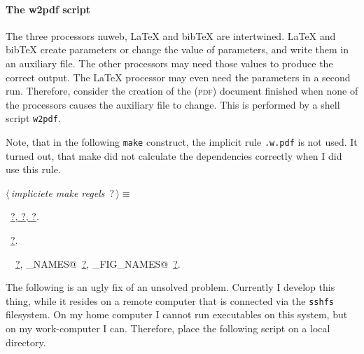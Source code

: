 \documentclass[twoside]{artikel3}
\newcommand{\pdf}{\textsc{pdf}}
\renewcommand{\NWlink}[2]{\hyperlink{#1}{#2}}
\renewcommand{\NWtarget}[2]{\hypertarget{#1}{#2}}
\renewcommand{\NWsep}{$\diamond$\rule[-1\baselineskip]{0pt}{1\baselineskip}}
\renewcommand{\NWlink}[2]{\hyperlink{#1}{#2}}
\renewcommand{\NWtarget}[2]{\hypertarget{#1}{#2}}
\begin{document}
\paragraph{The w2pdf script}
\label{sec:w2pdf}

The three processors nuweb, \LaTeX{} and bib\TeX{} are
intertwined. \LaTeX{} and bib\TeX{} create parameters or change the
value of parameters, and write them in an auxiliary file. The other
processors may need those values to produce the correct output. The
\LaTeX{} processor may even need the parameters in a second
run. Therefore, consider the creation of the (\pdf) document finished
when none of the processors causes the auxiliary file to change. This
is performed by a shell script \verb|w2pdf|.




Note, that in the following \texttt{make} construct, the implicit rule
\verb|.w.pdf| is not used. It turned out, that make did not calculate
the dependencies correctly when I did use this rule.

\begin{flushleft} \small
\begin{minipage}{\linewidth}\label{scrap18}\raggedright\small
\NWtarget{nuweb?}{} $\langle\,${\itshape impliciete make regels}\nobreak\ {\footnotesize {?}}$\,\rangle\equiv$
\vspace{-1ex}
\vspace{-1.5ex}
\footnotesize
\begin{list}{}{\setlength{\itemsep}{-\parsep}\setlength{\itemindent}{-\leftmargin}}
\item \NWtxtMacroDefBy\ \NWlink{nuweb?}{?}\NWlink{nuweb?}{, ?}\NWlink{nuweb?}{, ?}.
\item \NWtxtMacroRefIn\ \NWlink{nuweb?}{?}.
\item \NWtxtIdentsUsed\nobreak\  \verb@pdf@\nobreak\ \NWlink{nuweb?}{?}, \verb@PDFT_NAMES@\nobreak\ \NWlink{nuweb?}{?}, \verb@PDF_FIG_NAMES@\nobreak\ \NWlink{nuweb?}{?}.
\item{}
\end{list}
\end{minipage}\vspace{4ex}
\end{flushleft}
The following is an ugly fix of an unsolved problem. Currently I
develop this thing, while it resides on a remote computer that is
connected via the \verb|sshfs| filesystem. On my home computer I
cannot run executables on this system, but on my work-computer I
can. Therefore, place the following script on a local directory.
\end{document}
